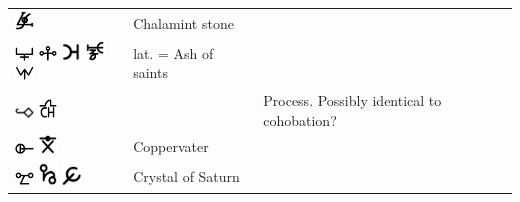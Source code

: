 \documentclass[british,final,landscape]{scrartcl}
\begin{document}
\begin{refsection}
\begin{supertabular}{p{0.3\textwidth}p{0.34\textwidth}p{0.34\textwidth}}
   \includegraphics[width=5mm]{Unknown/ChalamintStone} & Chalamint stone & \\
   \includegraphics[width=5mm]{Unknown/CineresSaiicis} \includegraphics[width=5mm]{Unknown/CineresSaiicis2} \includegraphics[width=5mm]{Unknown/CineresSaiicis3} \includegraphics[width=5mm]{Unknown/CineresSaiicis4} \includegraphics[width=5mm]{Unknown/CineresSaiicis5} & lat.  = Ash of saints & \\
   \includegraphics[width=5mm]{Unknown/Cohabitio} \includegraphics[width=5mm]{Unknown/Cohabitio2} &  & Process. Possibly identical to cohobation? \\
   \includegraphics[width=5mm]{Unknown/CopperVater} \includegraphics[width=5mm]{Unknown/CopperVater2} & Coppervater & \\
   \includegraphics[width=5mm]{Unknown/CrystalOfSaturn} \includegraphics[width=5mm]{Unknown/CrystalOfSaturn2} \includegraphics[width=5mm]{Unknown/CrystalOfSaturn3} & Crystal of Saturn & \\

\end{supertabular}
\end{refsection}
\end{document}
